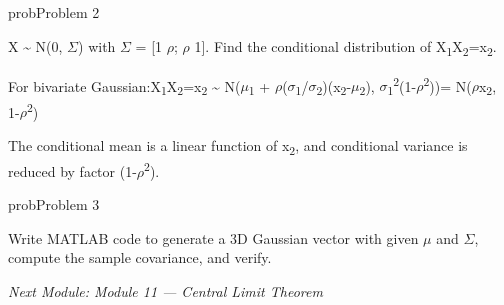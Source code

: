 \begin{PSbox}[unbreakable]{prob}{Problem 2}

X \textasciitilde{} N(0, \ensuremath{\Sigma}) with \ensuremath{\Sigma} = [1 \ensuremath{\rho}; \ensuremath{\rho} 1]. Find the conditional distribution of X\textsubscript{1}\textbar{}X\textsubscript{2}=x\textsubscript{2}.

\PSsolution{} For bivariate Gaussian:\PSbr{}X\textsubscript{1}\textbar{}X\textsubscript{2}=x\textsubscript{2} \textasciitilde{} N(\ensuremath{\mu}\textsubscript{1} + \ensuremath{\rho}(\ensuremath{\sigma}\textsubscript{1}/\ensuremath{\sigma}\textsubscript{2})(x\textsubscript{2}-\ensuremath{\mu}\textsubscript{2}), \ensuremath{\sigma}\textsubscript{1}\textsuperscript{2}(1-\ensuremath{\rho}\textsuperscript{2}))\PSbr{}= N(\ensuremath{\rho}x\textsubscript{2}, 1-\ensuremath{\rho}\textsuperscript{2})

The conditional mean is a linear function of x\textsubscript{2}, and conditional variance is reduced by factor (1-\ensuremath{\rho}\textsuperscript{2}).

\end{PSbox}

\begin{PSbox}[unbreakable]{prob}{Problem 3}

Write MATLAB code to generate a 3D Gaussian vector with given \ensuremath{\mu} and \ensuremath{\Sigma}, compute the sample covariance, and verify.

\PSsolution{} 


\begin{Shaded}
\begin{Highlighting}[]
 \OperatorTok{=}\NormalTok{ [}\OperatorTok{;} \OperatorTok{;} \OperatorTok{{-}}\NormalTok{]}\OperatorTok{;}
 \OperatorTok{=}\NormalTok{ [}  \OperatorTok{;}   \OperatorTok{{-}}\OperatorTok{;}  \OperatorTok{{-}} \NormalTok{]}\OperatorTok{;}
 \OperatorTok{=} \OperatorTok{;}
 \OperatorTok{=} \NormalTok{(}\OperatorTok{\textquotesingle{},} \OperatorTok{,} \NormalTok{)}\OperatorTok{;}
\NormalTok{(}\NormalTok{)}\OperatorTok{;} \NormalTok{(}\NormalTok{(}\NormalTok{)}\OperatorTok{\textquotesingle{}}\NormalTok{)}\OperatorTok{;}
\NormalTok{(}\NormalTok{)}\OperatorTok{;} \NormalTok{(}\NormalTok{(}\NormalTok{))}\OperatorTok{;}
\end{Highlighting}
\end{Shaded}

\emph{Next Module: {Module 11 — Central Limit Theorem}}

\end{PSbox}
